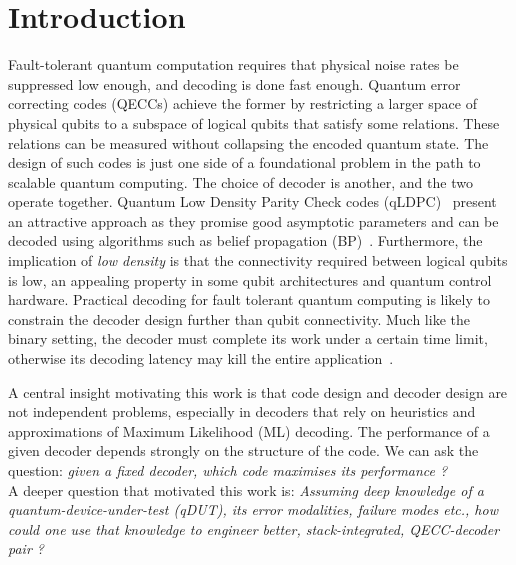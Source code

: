 \section{Introduction}\label{sec:intro}
Fault-tolerant quantum computation requires that physical noise rates be suppressed low enough, and decoding is done fast enough. 
Quantum error correcting codes (QECCs) achieve the former by restricting a larger space of physical 
qubits to a subspace of logical qubits that satisfy some relations.
These relations can be measured without collapsing the encoded quantum state. The design of such codes is just one side of a foundational problem in the path to scalable 
quantum computing. The choice of decoder is another, and the two operate together.
\noindent Quantum Low Density Parity Check codes (qLDPC)~\cite{panteleev2022asymptotically,bravyi2024high} present an attractive approach as they promise good asymptotic parameters and can be decoded using algorithms such as belief propagation (BP)~\cite{pearl1988probabilistic}.
Furthermore, the implication of \emph{low density} is that the connectivity required between logical qubits is low, an appealing property in some qubit architectures and quantum control hardware.
Practical decoding for fault tolerant quantum computing is likely to constrain the 
decoder design further than qubit connectivity.
Much like the binary setting, the decoder must complete its work under a 
certain time limit, otherwise its decoding latency may kill the entire application~\cite{sella2018fec}.

\noindent A central insight motivating this work is that code design and decoder design are not independent problems, 
especially in decoders that rely on heuristics and approximations of Maximum Likelihood (ML) decoding.
The performance of a given decoder depends strongly on the structure of the code.  
We can ask the question: \textit{given a fixed decoder, which code maximises its performance ?}\\

\noindent A deeper question that motivated this work is: \textit{Assuming deep knowledge of a quantum-device-under-test (qDUT), its error modalities, failure modes etc., how could one use that knowledge to engineer better, stack-integrated, QECC-decoder pair ?}

